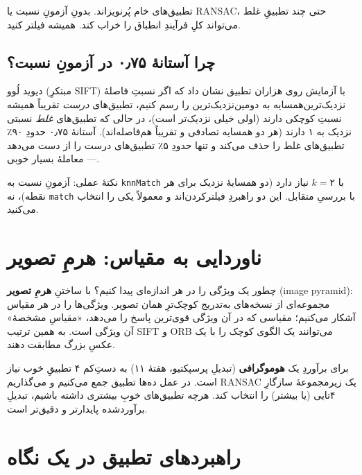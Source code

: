 \documentclass[12pt]{article}
\begin{document}
\begin{hoshdar}
تطبیق‌های خام پُرنویز‌اند. بدونِ آزمونِ نسبت یا RANSAC، حتی چند تطبیقِ غلط می‌تواند کلِ فرآیندِ انطباق را خراب کند. همیشه فیلتر کنید.
\end{hoshdar}

\subsection{چرا آستانهٔ ۰٫۷۵ در آزمونِ نسبت؟}

دیوید لُوو (مبتکرِ SIFT) با آزمایش روی هزاران تطبیق نشان داد که اگر نسبتِ فاصلهٔ نزدیک‌ترین‌همسایه به دومین‌نزدیک‌ترین را رسم کنیم، تطبیق‌های \emph{درست} تقریباً همیشه نسبتِ کوچکی دارند (اولی خیلی نزدیک‌تر است)، در حالی که تطبیق‌های \emph{غلط} نسبتی نزدیک به ۱ دارند (هر دو همسایه تصادفی و تقریباً هم‌فاصله‌اند). آستانهٔ $۰٫۷۵$ حدودِ ۹۰٪ تطبیق‌های غلط را حذف می‌کند و تنها حدودِ ۵٪ تطبیق‌های درست را از دست می‌دهد — معاملهٔ بسیار خوبی.

\begin{yaddasht}
نکتهٔ عملی: آزمونِ نسبت به \texttt{knnMatch} با $k=۲$ نیاز دارد (دو همسایهٔ نزدیک برای هر نقطه)، نه \texttt{match} با بررسیِ متقابل. این دو راهبردِ فیلترکردن‌اند و معمولاً یکی را انتخاب می‌کنید.
\end{yaddasht}

\section{ناوردایی به مقیاس: هرمِ تصویر}

چطور یک ویژگی را در هر اندازه‌ای پیدا کنیم؟ با ساختنِ \textbf{هرمِ تصویر} (image pyramid): مجموعه‌ای از نسخه‌های به‌تدریج کوچک‌ترِ همان تصویر. ویژگی‌ها را در هر مقیاس آشکار می‌کنیم؛ مقیاسی که در آن ویژگی قوی‌ترین پاسخ را می‌دهد، «مقیاسِ مشخصهٔ» آن ویژگی است. به همین ترتیب SIFT و ORB می‌توانند یک الگوی کوچک را با یک عکسِ بزرگ مطابقت دهند.

\begin{riyazi}
برای برآوردِ یک \textbf{هوموگرافی} (تبدیلِ پرسپکتیو، هفتهٔ ۱۱) به دستِ‌کم $۴$ تطبیقِ خوب نیاز است. در عمل ده‌ها تطبیق جمع می‌کنیم و می‌گذاریم RANSAC یک زیرمجموعهٔ سازگارِ ۴‌تایی (یا بیشتر) را انتخاب کند. هرچه تطبیق‌های خوبِ بیشتری داشته باشیم، تبدیلِ برآوردشده پایدارتر و دقیق‌تر است.
\end{riyazi}

\section{راهبردهای تطبیق در یک نگاه}
\end{document}
